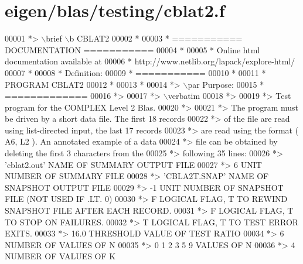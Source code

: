 \hypertarget{eigen_2blas_2testing_2cblat2_8f_source}{}\section{eigen/blas/testing/cblat2.f}
\label{eigen_2blas_2testing_2cblat2_8f_source}

\begin{DoxyCode}
00001 \textcolor{comment}{*> \(\backslash\)brief \(\backslash\)b CBLAT2}
00002 \textcolor{comment}{*}
00003 \textcolor{comment}{*  =========== DOCUMENTATION ===========}
00004 \textcolor{comment}{*}
00005 \textcolor{comment}{* Online html documentation available at }
00006 \textcolor{comment}{*            http://www.netlib.org/lapack/explore-html/ }
00007 \textcolor{comment}{*}
00008 \textcolor{comment}{*  Definition:}
00009 \textcolor{comment}{*  ===========}
00010 \textcolor{comment}{*}
00011 \textcolor{comment}{*       PROGRAM CBLAT2}
00012 \textcolor{comment}{* }
00013 \textcolor{comment}{*}
00014 \textcolor{comment}{*> \(\backslash\)par Purpose:}
00015 \textcolor{comment}{*  =============}
00016 \textcolor{comment}{*>}
00017 \textcolor{comment}{*> \(\backslash\)verbatim}
00018 \textcolor{comment}{*>}
00019 \textcolor{comment}{*> Test program for the COMPLEX          Level 2 Blas.}
00020 \textcolor{comment}{*>}
00021 \textcolor{comment}{*> The program must be driven by a short data file. The first 18 records}
00022 \textcolor{comment}{*> of the file are read using list-directed input, the last 17 records}
00023 \textcolor{comment}{*> are read using the format ( A6, L2 ). An annotated example of a data}
00024 \textcolor{comment}{*> file can be obtained by deleting the first 3 characters from the}
00025 \textcolor{comment}{*> following 35 lines:}
00026 \textcolor{comment}{*> 'cblat2.out'      NAME OF SUMMARY OUTPUT FILE}
00027 \textcolor{comment}{*> 6                 UNIT NUMBER OF SUMMARY FILE}
00028 \textcolor{comment}{*> 'CBLA2T.SNAP'     NAME OF SNAPSHOT OUTPUT FILE}
00029 \textcolor{comment}{*> -1                UNIT NUMBER OF SNAPSHOT FILE (NOT USED IF .LT. 0)}
00030 \textcolor{comment}{*> F        LOGICAL FLAG, T TO REWIND SNAPSHOT FILE AFTER EACH RECORD.}
00031 \textcolor{comment}{*> F        LOGICAL FLAG, T TO STOP ON FAILURES.}
00032 \textcolor{comment}{*> T        LOGICAL FLAG, T TO TEST ERROR EXITS.}
00033 \textcolor{comment}{*> 16.0     THRESHOLD VALUE OF TEST RATIO}
00034 \textcolor{comment}{*> 6                 NUMBER OF VALUES OF N}
00035 \textcolor{comment}{*> 0 1 2 3 5 9       VALUES OF N}
00036 \textcolor{comment}{*> 4                 NUMBER OF VALUES OF K}

\end{DoxyCode}
